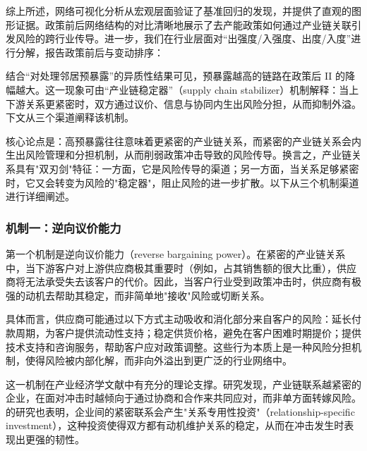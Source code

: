 综上所述，网络可视化分析从宏观层面验证了基准回归的发现，并提供了直观的图形证据。政策前后网络结构的对比清晰地展示了去产能政策如何通过产业链关联引发风险的跨行业传导。进一步，我们在行业层面对“出强度/入强度、出度/入度”进行分解，报告政策前后与变动排序：






结合“对处理邻居预暴露”的异质性结果可见，预暴露越高的链路在政策后 II 的降幅越大。这一现象可由“产业链稳定器”（supply chain stabilizer）机制解释：当上下游关系更紧密时，双方通过议价、信息与协同内生出风险分担，从而抑制外溢。下文从三个渠道阐释该机制。

核心论点是：高预暴露往往意味着更紧密的产业链关系，而紧密的产业链关系会内生出风险管理和分担机制，从而削弱政策冲击导致的风险传导。换言之，产业链关系具有"双刃剑"特征：一方面，它是风险传导的渠道；另一方面，当关系足够紧密时，它又会转变为风险的"稳定器"，阻止风险的进一步扩散。以下从三个机制渠道进行详细阐述。

\subsubsection*{机制一：逆向议价能力}

第一个机制是逆向议价能力（reverse bargaining power）。在紧密的产业链关系中，当下游客户对上游供应商极其重要时（例如，占其销售额的很大比重），供应商将无法承受失去该客户的代价。因此，当客户行业受到政策冲击时，供应商有极强的动机去帮助其稳定，而非简单地"接收"风险或切断关系。

具体而言，供应商可能通过以下方式主动吸收和消化部分来自客户的风险：延长付款周期，为客户提供流动性支持；稳定供货价格，避免在客户困难时期提价；提供技术支持和咨询服务，帮助客户应对政策调整。这些行为本质上是一种风险分担机制，使得风险被内部化解，而非向外溢出到更广泛的行业网络中。

这一机制在产业经济学文献中有充分的理论支撑。\citet{ahern2014importance}研究发现，产业链联系越紧密的企业，在面对冲击时越倾向于通过协商和合作来共同应对，而非单方面转嫁风险。\citet{hertzel2008intra}的研究也表明，企业间的紧密联系会产生"关系专用性投资"（relationship-specific investment），这种投资使得双方都有动机维护关系的稳定，从而在冲击发生时表现出更强的韧性。

